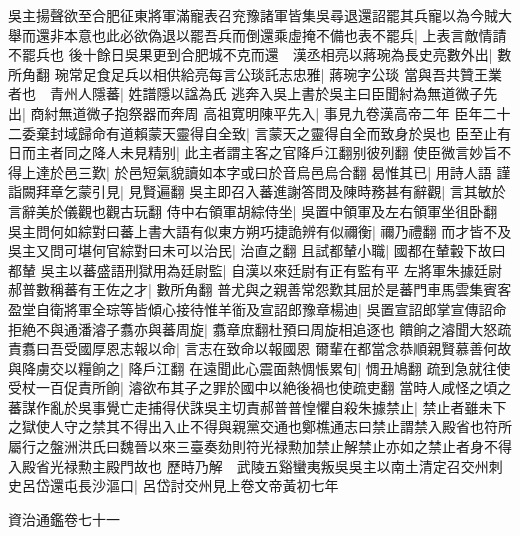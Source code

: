 吳主揚聲欲至合肥征東將軍滿寵表召兖豫諸軍皆集吳尋退還詔罷其兵寵以為今賊大舉而還非本意也此必欲偽退以罷吾兵而倒還乘虛掩不備也表不罷兵|{
	上表言敵情請不罷兵也}
後十餘日吳果更到合肥城不克而還　漢丞相亮以蔣琬為長史亮數外出|{
	數所角翻}
琬常足食足兵以相供給亮每言公琰託志忠雅|{
	蔣琬字公琰}
當與吾共贊王業者也　青州人隱蕃|{
	姓譜隱以諡為氏}
逃奔入吳上書於吳主曰臣聞紂為無道微子先出|{
	商紂無道微子抱祭器而奔周}
高祖寛明陳平先入|{
	事見九卷漢高帝二年}
臣年二十二委棄封域歸命有道賴蒙天靈得自全致|{
	言蒙天之靈得自全而致身於吳也}
臣至止有日而主者同之降人未見精别|{
	此主者謂主客之官降戶江翻别彼列翻}
使臣微言妙旨不得上達於邑三歎|{
	於邑短氣貌讀如本字或曰於音烏邑烏合翻}
曷惟其已|{
	用詩人語}
謹詣闕拜章乞蒙引見|{
	見賢遍翻}
吳主即召入蕃進謝答問及陳時務甚有辭觀|{
	言其敏於言辭美於儀觀也觀古玩翻}
侍中右領軍胡綜侍坐|{
	吳置中領軍及左右領軍坐徂卧翻}
吳主問何如綜對曰蕃上書大語有似東方朔巧捷詭辨有似禰衡|{
	禰乃禮翻}
而才皆不及吳主又問可堪何官綜對曰未可以治民|{
	治直之翻}
且試都輦小職|{
	國都在輦轂下故曰都輦}
吳主以蕃盛語刑獄用為廷尉監|{
	自漢以來廷尉有正有監有平}
左將軍朱據廷尉郝普數稱蕃有王佐之才|{
	數所角翻}
普尤與之親善常怨歎其屈於是蕃門車馬雲集賓客盈堂自衛將軍全琮等皆傾心接待惟羊衜及宣詔郎豫章楊迪|{
	吳置宣詔郎掌宣傳詔命}
拒絶不與通潘濬子翥亦與蕃周旋|{
	翥章庶翻杜預曰周旋相追逐也}
饋餉之濬聞大怒疏責翥曰吾受國厚恩志報以命|{
	言志在致命以報國恩}
爾輩在都當念恭順親賢慕善何故與降虜交以糧餉之|{
	降戶江翻}
在遠聞此心震面熱惆悵累旬|{
	惆丑鳩翻}
疏到急就往使受杖一百促責所餉|{
	濬欲布其子之罪於國中以絶後禍也使疏吏翻}
當時人咸怪之頃之蕃謀作亂於吳事覺亡走捕得伏誅吳主切責郝普普惶懼自殺朱據禁止|{
	禁止者雖未下之獄使人守之禁其不得出入止不得與親黨交通也鄭樵通志曰禁止謂禁入殿省也符所屬行之盤洲洪氏曰魏晉以來三臺奏劾則符光禄勲加禁止解禁止亦如之禁止者身不得入殿省光禄勲主殿門故也}
歷時乃解　武陵五谿蠻夷叛吳吳主以南土清定召交州刺史呂岱還屯長沙漚口|{
	呂岱討交州見上卷文帝黃初七年}


資治通鑑卷七十一
